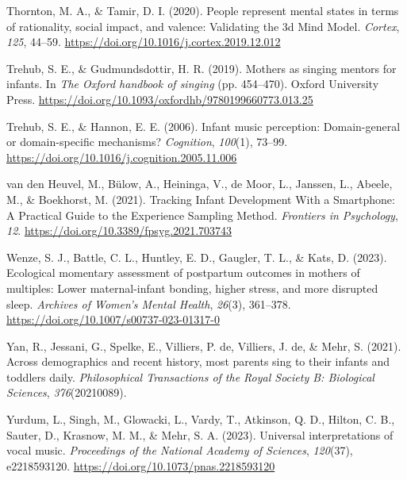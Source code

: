 \documentclass[
]{article}
\newlength{\cslhangindent}
\newenvironment{CSLReferences}[2] %
 {\begin{list}{}{%
  \setlength{\itemindent}{0pt}
  \setlength{\leftmargin}{0pt}
  \setlength{\parsep}{0pt}
  \ifodd #1
   \setlength{\leftmargin}{\cslhangindent}
   \setlength{\itemindent}{-1\cslhangindent}
  \fi
  \setlength{\itemsep}{#2\baselineskip}}}
 {\end{list}}
\begin{document}
\begin{CSLReferences}{1}{0}
Thornton, M. A., \& Tamir, D. I. (2020). People represent mental states
in terms of rationality, social impact, and valence: {Validating} the 3d
{Mind Model}. \emph{Cortex}, \emph{125}, 44--59.
\url{https://doi.org/10.1016/j.cortex.2019.12.012}

Trehub, S. E., \& Gudmundsdottir, H. R. (2019). Mothers as singing
mentors for infants. In \emph{The {Oxford} handbook of singing} (pp.
454--470). Oxford University Press.
\url{https://doi.org/10.1093/oxfordhb/9780199660773.013.25}

Trehub, S. E., \& Hannon, E. E. (2006). Infant music perception:
{Domain-general} or domain-specific mechanisms? \emph{Cognition},
\emph{100}(1), 73--99.
\url{https://doi.org/10.1016/j.cognition.2005.11.006}

van den Heuvel, M., Bülow, A., Heininga, V., de Moor, L., Janssen, L.,
Abeele, M., \& Boekhorst, M. (2021). Tracking {Infant Development With}
a {Smartphone}: {A Practical Guide} to the {Experience Sampling Method}.
\emph{Frontiers in Psychology}, \emph{12}.
\url{https://doi.org/10.3389/fpsyg.2021.703743}

Wenze, S. J., Battle, C. L., Huntley, E. D., Gaugler, T. L., \& Kats, D.
(2023). Ecological momentary assessment of postpartum outcomes in
mothers of multiples: Lower maternal-infant bonding, higher stress, and
more disrupted sleep. \emph{Archives of Women's Mental Health},
\emph{26}(3), 361--378. \url{https://doi.org/10.1007/s00737-023-01317-0}

Yan, R., Jessani, G., Spelke, E., Villiers, P. de, Villiers, J. de, \&
Mehr, S. (2021). Across demographics and recent history, most parents
sing to their infants and toddlers daily. \emph{Philosophical
Transactions of the Royal Society B: Biological Sciences},
\emph{376}(20210089).

Yurdum, L., Singh, M., Glowacki, L., Vardy, T., Atkinson, Q. D., Hilton,
C. B., Sauter, D., Krasnow, M. M., \& Mehr, S. A. (2023). Universal
interpretations of vocal music. \emph{Proceedings of the National
Academy of Sciences}, \emph{120}(37), e2218593120.
\url{https://doi.org/10.1073/pnas.2218593120}

\end{CSLReferences}
\end{document}
